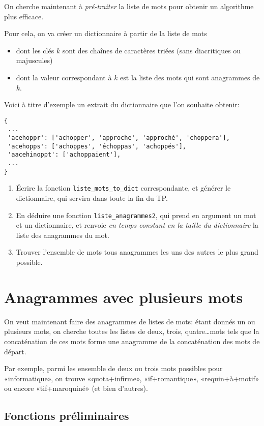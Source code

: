 \documentclass[10pt]{article}
\begin{document}
On cherche maintenant à \emph{pré-traiter} la liste de mots pour
obtenir un algorithme plus efficace.

Pour cela, on va créer un dictionnaire à partir de la liste de mots
\begin{itemize}
\item dont les clés $k$ sont des chaînes de caractères triées (sans diacritiques ou majuscules)
\item dont la valeur correspondant à $k$ est la liste des mots qui sont anagrammes de $k$.
\end{itemize}

Voici à titre d'exemple un extrait du dictionnaire que l'on souhaite obtenir:

\begin{verbatim}
{
 ...
 'acehoppr': ['achopper', 'approche', 'approché', 'choppera'],
 'acehopps': ['achoppes', 'échoppas', 'achoppés'],
 'aacehinoppt': ['achoppaient'],
 ...
}
\end{verbatim}

\begin{enumerate}[resume]
\item Écrire la fonction \verb+liste_mots_to_dict+ correspondante, et générer le dictionnaire, qui servira dans toute la fin du TP.
\item En déduire une fonction \verb+liste_anagrammes2+, qui prend en
  argument un mot et un dictionnaire, et renvoie \emph{en temps
    constant en la taille du dictionnaire} la liste des anagrammes du mot.
\item Trouver l'ensemble de mots tous anagrammes les uns des autres le plus grand possible. 
\end{enumerate}

\section{Anagrammes avec plusieurs mots}

On veut maintenant faire des anagrammes de listes de mots: étant
donnés un ou plusieurs mots, on cherche toutes les listes de deux,
trois, quatre\dots mots tels que la concaténation de ces mots forme une
anagramme de la concaténation des mots de départ.

Par exemple, parmi les ensemble de deux ou trois mots possibles pour
«informatique», on trouve «quota+infirme», «if+romantique»,
«requin+à+motif» ou encore «tif+maroquiné» (et bien d'autres).

\subsection*{Fonctions préliminaires}
\end{document}
